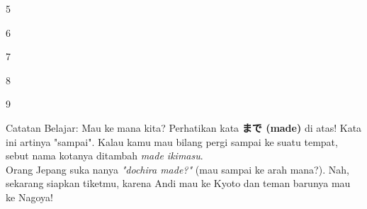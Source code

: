 \begin{convobox}{5}
    \noindent
      
     

    \vspace{1.5em}
\end{convobox}

\begin{convobox}{6}
    \noindent
     

    \vspace{1.5em}
\end{convobox}

\begin{convobox}{7}
    \noindent
      
      
      

    \vspace{1.5em}
\end{convobox}

\begin{convobox}{8}
    \noindent
      

    \vspace{1.5em}
\end{convobox}

\begin{convobox}{9}
    \noindent
      
      

    \vspace{1.5em}
\end{convobox}

\begin{lessonbox}{Catatan Belajar: Mau ke mana kita?}
    Perhatikan kata \textbf{まで (made)} di atas! Kata ini artinya "sampai". Kalau kamu mau bilang pergi sampai ke suatu tempat, sebut nama kotanya ditambah \textit{made ikimasu}. \\
    
    Orang Jepang suka nanya \textit{"dochira made?"} (mau sampai ke arah mana?). Nah, sekarang siapkan tiketmu, karena Andi mau ke Kyoto dan teman barunya mau ke Nagoya!
\end{lessonbox}

